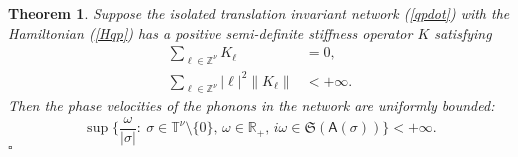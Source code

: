 \documentclass[letterpaper, 10pt, conference]{ieeeconf}  %
\newtheorem{thm}{Theorem}
\def\mZ{\mathbb{Z}}    %
\def\mR{\mathbb{R}}    %
\def\ox{\otimes}
\def\fS{\mathfrak{S}}
\def\sA{\mathsf{A}}
\def\mT{\mathbb{T}}
\def\mZ{\mathbb{Z}}
\begin{document}
\begin{thm}
\label{th:phon}
Suppose the isolated translation invariant network (\ref{qpdot}) with the Hamiltonian (\ref{Hqp}) has a positive semi-definite stiffness operator $K$ satisfying
\begin{align}
\label{K0}
    \sum_{\ell \in \mZ^\nu}
    K_{\ell} & = 0,\\
\label{K2}
  \sum_{\ell \in \mZ^\nu}
  |\ell|^2
  \|K_\ell\|
  & <+\infty.
\end{align}
Then the phase velocities of the phonons in the network are uniformly bounded:
\begin{equation}
\label{speed}
  \sup
  \Big\{
        \frac{\omega}{|\sigma|}:\
        \sigma
        \in
        \mT^\nu\setminus\{0\},\,
        \omega
        \in
        \mR_+,\,
        i\omega
        \in
        \fS(\sA(\sigma))
  \Big\}
  <+\infty.
\end{equation}
\hfill$\square$
\end{thm}
\end{document}
